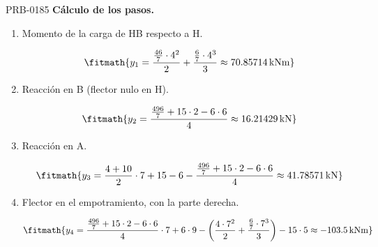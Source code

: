 \begin{studiumworked}{PRB-0185}
\textbf{Cálculo de los pasos.}

\begin{enumerate}

\item Momento de la carga de HB respecto a H.

\[\fitmath{y_{1}=\frac{\frac{46}{7}\cdot {4}^{2}}{2}+\frac{\frac{6}{7}\cdot {4}^{3}}{3}\approx 70.85714\,\mathrm{kN m}}\]

\item Reacción en B (flector nulo en H).

\[\fitmath{y_{2}=\frac{\frac{496}{7}+15\cdot 2-6\cdot 6}{4}\approx 16.21429\,\mathrm{kN}}\]

\item Reacción en A.

\[\fitmath{y_{3}=\frac{4+10}{2}\cdot 7+15-6-\frac{\frac{496}{7}+15\cdot 2-6\cdot 6}{4}\approx 41.78571\,\mathrm{kN}}\]

\item Flector en el empotramiento, con la parte derecha.

\[\fitmath{y_{4}=\frac{\frac{496}{7}+15\cdot 2-6\cdot 6}{4}\cdot 7+6\cdot 9-\left(\frac{4\cdot {7}^{2}}{2}+\frac{\frac{6}{7}\cdot {7}^{3}}{3}\right)-15\cdot 5\approx -103.5\,\mathrm{kN m}}\]

\end{enumerate}


\end{studiumworked}
